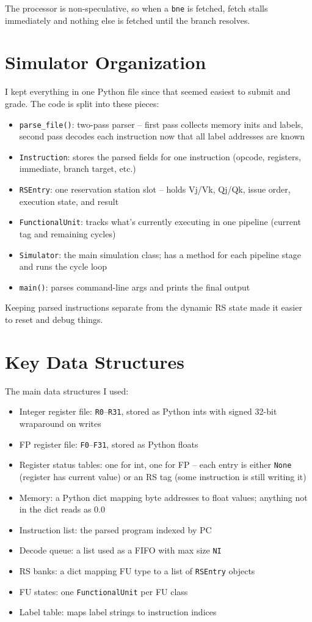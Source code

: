 \documentclass[11pt]{article}
\begin{document}
The processor is non-speculative, so when a \texttt{bne} is fetched, fetch stalls immediately and nothing else is fetched until the branch resolves.

\section{Simulator Organization}
I kept everything in one Python file since that seemed easiest to submit and grade. The code is split into these pieces:

\begin{itemize}
\item \texttt{parse\_file()}: two-pass parser -- first pass collects memory inits and labels, second pass decodes each instruction now that all label addresses are known
\item \texttt{Instruction}: stores the parsed fields for one instruction (opcode, registers, immediate, branch target, etc.)
\item \texttt{RSEntry}: one reservation station slot -- holds Vj/Vk, Qj/Qk, issue order, execution state, and result
\item \texttt{FunctionalUnit}: tracks what's currently executing in one pipeline (current tag and remaining cycles)
\item \texttt{Simulator}: the main simulation class; has a method for each pipeline stage and runs the cycle loop
\item \texttt{main()}: parses command-line args and prints the final output
\end{itemize}

Keeping parsed instructions separate from the dynamic RS state made it easier to reset and debug things.

\section{Key Data Structures}
The main data structures I used:

\begin{itemize}
\item Integer register file: \texttt{R0}--\texttt{R31}, stored as Python ints with signed 32-bit wraparound on writes
\item FP register file: \texttt{F0}--\texttt{F31}, stored as Python floats
\item Register status tables: one for int, one for FP -- each entry is either \texttt{None} (register has current value) or an RS tag (some instruction is still writing it)
\item Memory: a Python dict mapping byte addresses to float values; anything not in the dict reads as 0.0
\item Instruction list: the parsed program indexed by PC
\item Decode queue: a list used as a FIFO with max size \texttt{NI}
\item RS banks: a dict mapping FU type to a list of \texttt{RSEntry} objects
\item FU states: one \texttt{FunctionalUnit} per FU class
\item Label table: maps label strings to instruction indices
\end{itemize}
\end{document}
